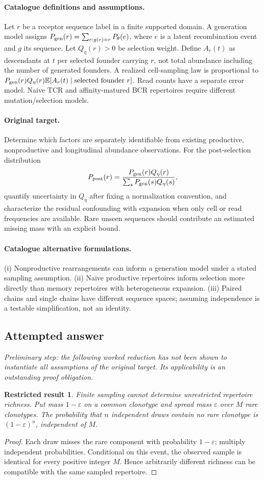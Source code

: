 \documentclass[11pt]{article}
\newcommand{\E}{\mathbb E}
\providecommand{\E}{\mathbb E}
\newtheorem{attemptresult}{Restricted result}[section]
\begin{document}
\paragraph{Catalogue definitions and assumptions.}
Let $r$ be a receptor sequence label in a finite supported domain. A generation model assigns $P_{\rm gen}(r)=\sum_{e:g(e)=r}P_\theta(e)$, where $e$ is a latent recombination event and $g$ its sequence. Let $Q_\eta(r)>0$ be selection weight. Define $A_r(t)$ as descendants at $t$ per selected founder carrying $r$, not total abundance including the number of generated founders. A realized cell-sampling law is proportional to $P_{\rm gen}(r)Q_\eta(r)\E[A_r(t)\mid\text{selected founder }r]$. Read counts have a separate error model. Naive TCR and affinity-matured BCR repertoires require different mutation/selection models.
\paragraph{Original target.}
Determine which factors are separately identifiable from existing productive, nonproductive and longitudinal abundance observations. For the post-selection distribution
    \[P_{\rm post}(r)=\frac{P_{\rm gen}(r)Q_\eta(r)}{\sum_sP_{\rm gen}(s)Q_\eta(s)},\]
    quantify uncertainty in $Q_\eta$ after fixing a normalization convention, and characterize the residual confounding with expansion when only cell or read frequencies are available. Rare unseen sequences should contribute an estimated missing mass with an explicit bound.
\paragraph{Catalogue alternative formulations.}
(i) Nonproductive rearrangements can inform a generation model under a stated sampling assumption. (ii) Naive productive repertoires inform selection more directly than memory repertoires with heterogeneous expansion. (iii) Paired chains and single chains have different sequence spaces; assuming independence is a testable simplification, not an identity.
\subsection{Attempted answer}
\noindent\emph{Preliminary step: the following worked reduction has not been shown to instantiate all assumptions of the original target. Its applicability is an outstanding proof obligation.}

\begin{attemptresult}
Finite sampling cannot determine unrestricted repertoire richness. Put mass $1-\varepsilon$ on a common clonotype and spread mass $\varepsilon$ over $M$ rare clonotypes. The probability that $n$ independent draws contain no rare clonotype is $(1-\varepsilon)^n$, independent of $M$.
\end{attemptresult}
\begin{proof}
Each draw misses the rare component with probability $1-\varepsilon$; multiply independent probabilities. Conditional on this event, the observed sample is identical for every positive integer $M$. Hence arbitrarily different richness can be compatible with the same sampled repertoire.
\end{proof}
\end{document}
